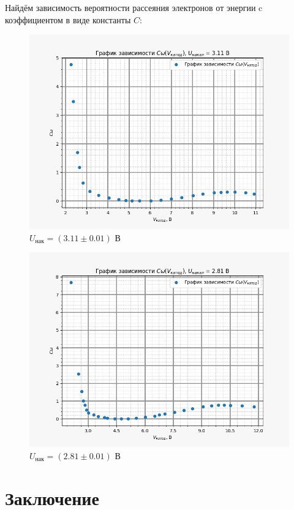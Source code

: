 \begin{enumerate}
		Найдём зависимость вероятности рассеяния электронов от энергии c коэффициентом в виде константы $C$:

		\begin{figure}[H]
			\centering
			\includegraphics[width = 12 cm]{images/probability_311}
			\caption{$U_{\text{нак}} = (3.11 \pm 0.01) \text{ В}$}
			\label{prob_311}
		\end{figure}

		\begin{figure}[H]
			\centering
			\includegraphics[width = 12 cm]{images/probability_281}
			\caption{$U_{\text{нак}} = (2.81 \pm 0.01) \text{ В}$}
			\label{prob_281}
		\end{figure}
		
	\end{enumerate}

	

\section{Заключение}

